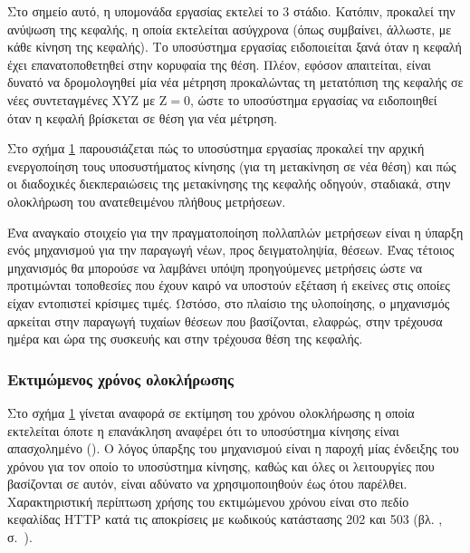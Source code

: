 Στο σημείο αυτό, η υπομονάδα εργασίας εκτελεί το 3 στάδιο. Κατόπιν,
προκαλεί την ανύψωση της κεφαλής, η οποία εκτελείται ασύγχρονα (όπως συμβαίνει,
άλλωστε, με κάθε κίνηση της κεφαλής). Το υποσύστημα εργασίας ειδοποιείται ξανά
όταν η κεφαλή έχει επανατοποθετηθεί στην κορυφαία της θέση. Πλέον, εφόσον
απαιτείται, είναι δυνατό να δρομολογηθεί μία νέα μέτρηση προκαλώντας τη
μετατόπιση της κεφαλής σε νέες συντεταγμένες XYZ με $\text{Z} = 0$, ώστε το
υποσύστημα εργασίας να ειδοποιηθεί όταν η κεφαλή βρίσκεται σε θέση για νέα
μέτρηση.

Στο σχήμα \ref{fig:task:samples} παρουσιάζεται πώς το υποσύστημα εργασίας
προκαλεί την αρχική ενεργοποίηση τους υποσυστήματος κίνησης (για τη μετακίνηση
σε νέα θέση) και πώς οι διαδοχικές διεκπεραιώσεις της μετακίνησης της κεφαλής
οδηγούν, σταδιακά, στην ολοκλήρωση του ανατεθειμένου πλήθους μετρήσεων.

\begin{figure}
    \caption{
    \label{fig:task:samples}}
\end{figure}

Ένα αναγκαίο στοιχείο για την πραγματοποίηση πολλαπλών μετρήσεων είναι η ύπαρξη
ενός μηχανισμού για την παραγωγή νέων, προς δειγματοληψία, θέσεων. Ένας τέτοιος
μηχανισμός θα μπορούσε να λαμβάνει υπόψη προηγούμενες μετρήσεις ώστε να
προτιμώνται τοποθεσίες που έχουν καιρό να υποστούν εξέταση ή εκείνες στις οποίες
είχαν εντοπιστεί κρίσιμες τιμές. Ωστόσο, στο πλαίσιο της υλοποίησης, ο
μηχανισμός αρκείται στην παραγωγή τυχαίων θέσεων που βασίζονται, ελαφρώς, στην
τρέχουσα ημέρα και ώρα της συσκευής
και στην τρέχουσα θέση της κεφαλής.


\subsubsection{Εκτιμώμενος χρόνος ολοκλήρωσης}

Στο σχήμα \ref{fig:task:samples} γίνεται αναφορά σε εκτίμηση του χρόνου
ολοκλήρωσης η οποία εκτελείται όποτε η επανάκληση αναφέρει ότι το υποσύστημα
κίνησης είναι απασχολημένο (). Ο λόγος ύπαρξης του μηχανισμού είναι η
παροχή μίας ένδειξης του χρόνου για τον οποίο το υποσύστημα κίνησης, καθώς και
όλες οι λειτουργίες που βασίζονται σε αυτόν, είναι αδύνατο να χρησιμοποιηθούν
έως ότου παρέλθει. Χαρακτηριστική περίπτωση χρήσης του εκτιμώμενου χρόνου είναι
στο πεδίο κεφαλίδας HTTP  κατά τις αποκρίσεις με κωδικούς
κατάστασης 202 και 503 (βλ. ,
σ.~\pageref{sec:network:impl-resources}).

